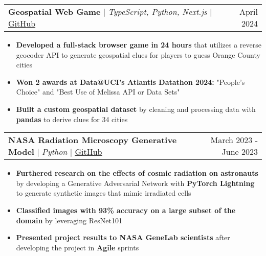 \documentclass[letterpaper,11pt]{article}
\makeatletter
\newcommand{\resumeItem}[1]{
  \item\setstretch{.95}\small{
    {#1 \vspace{-2pt}}
  }
}
\newcommand{\resumeProjectHeading}[4]{
    \item
    \begin{tabular*}{0.97\textwidth}{l@{\extracolsep{\fill}}r}
      \small#1 & #2 \\
    \end{tabular*}\vspace{-4.8pt}
}
\newcommand{\resumeItemListStart}{\begin{itemize}}
\newcommand{\resumeItemListEnd}{\end{itemize}\vspace{-5pt}}
\makeatother
\begin{document}
    \resumeProjectHeading
      {\textbf{Geospatial Web Game} $|$ \emph{TypeScript, Python, Next.js} $|$ \href{https://github.com/dlustre/geodle}{\uline{GitHub}}}{April 2024}
      {Wordle-inspired game that challenges players to guess the Orange County city based on geospatial clues}
      {\href{https://geodle-seven.vercel.app/}{\uline{Demo}} $|$ \href{https://github.com/dlustre/geodle}{\uline{GitHub}}}
      \resumeItemListStart
        \resumeItem{\textbf{Developed a full-stack browser game in 24 hours} that utilizes a reverse geocoder API to generate geospatial clues for players to guess Orange County cities}
        \resumeItem{\textbf{Won 2 awards at Data@UCI's Atlantis Datathon 2024:} "People's Choice" and "Best Use of Melissa API or Data Sets"}
        \resumeItem{\textbf{Built a custom geospatial dataset} by cleaning and processing data with \textbf{pandas} to derive clues for 34 cities}
      \resumeItemListEnd

    \resumeProjectHeading
      {\textbf{NASA Radiation Microscopy Generative Model} $|$ \emph{Python} $|$ {\href{https://github.com/UC-Irvine-CS175/final-project-shenanigans}{\uline{GitHub}}}}{March 2023 - June 2023}
      {ML pipeline designed to augment NASA's BPS Microscopy Dataset on AWS with synthetic radiation images}
      {\href{https://github.com/UC-Irvine-CS175/final-project-shenanigans}{\uline{GitHub}}}
      \resumeItemListStart
        \resumeItem{\textbf{Furthered research on the effects of cosmic radiation on astronauts} by developing a Generative Adversarial Network with \textbf{PyTorch Lightning} to generate synthetic images that mimic irradiated cells}
        \resumeItem{\textbf{Classified images with 93\% accuracy on a large subset of the domain} by leveraging ResNet101}
        \resumeItem{\textbf{Presented project results to NASA GeneLab scientists} after developing the project in \textbf{Agile} sprints}
      \resumeItemListEnd
\end{document}
